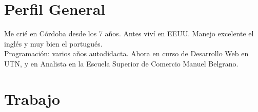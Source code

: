 \documentclass[a4paper,hidelinks]{twentysecondcv}
\begin{document}


\makeprofile %

\vfill 




\section{Perfil General} %

Me crié en Córdoba desde los 7 años. Antes viví en EEUU. 
Manejo excelente el inglés y muy bien el portugués.\\
Programación: varios años autodidacta. Ahora en curso de Desarrollo Web en UTN, y en Analista en la Escuela Superior de Comercio Manuel Belgrano.

\section{Trabajo}
\end{document}
